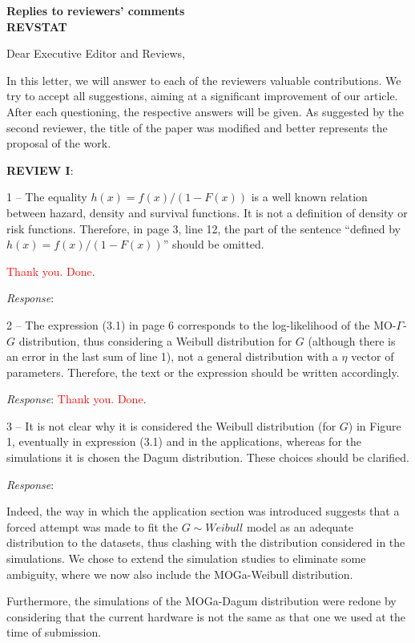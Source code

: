 \documentclass[version=last,12pt,{"maintainersDelight"}]{scrlttr2}
\begin{document}
\begin{letter}{\textbf{Replies to reviewers' comments}\\\textbf{REVSTAT}\\}
\opening{Dear Executive Editor and Reviews,}

In this letter, we will answer to each of the reviewers valuable
contributions. We try to accept all suggestions, aiming at a significant
improvement of our article. After each questioning, the respective
answers will be given. As suggested by the second reviewer, the title of
the paper was modified and better represents the proposal of the work.

\textbf{REVIEW I}:

1 -- The equality \(h(x)=f(x)/(1-F(x))\) is a well known relation
between hazard, density and survival functions. It is not a definition of density or risk functions. 
Therefore, in page 3, line 12, the part of the sentence ``defined by \(h(x)=f(x)/(1-F(x))\)'' should be 
omitted.

\textcolor{red}{Thank you. Done}. 

\emph{Response}:

2 -- The expression (3.1) in page 6 corresponds to the log-likelihood of the MO-\(\Gamma\)-\(G\) distribution, 
thus considering a Weibull distribution for \(G\) (although there is an error in the last sum 
of line 1), not a general distribution with a \(\eta\) 
vector of parameters. Therefore, the text or the expression 
should be written accordingly.

\emph{Response}: \textcolor{red}{Thank you. Done}. 

3 -- It is not clear why it is considered the Weibull distribution (for \(G\)) in Figure 1, eventually in expression (3.1) and in 
the applications, whereas for the simulations it is chosen the 
Dagum distribution. These choices should be clarified.

\emph{Response}:
{\color{red} Indeed, the way in which the application section was introduced suggests that a forced attempt was made to fit the $G\sim Weibull$ model as an adequate distribution to the datasets, thus clashing with the distribution considered in the simulations. We chose to extend the simulation studies to eliminate some 
ambiguity, where we now also include the MOGa-Weibull distribution. 

Furthermore, the simulations of the MOGa-Dagum distribution were redone by considering that the current hardware is not 
the same as that one we used at the time of submission.

}
\end{letter}
\end{document}
